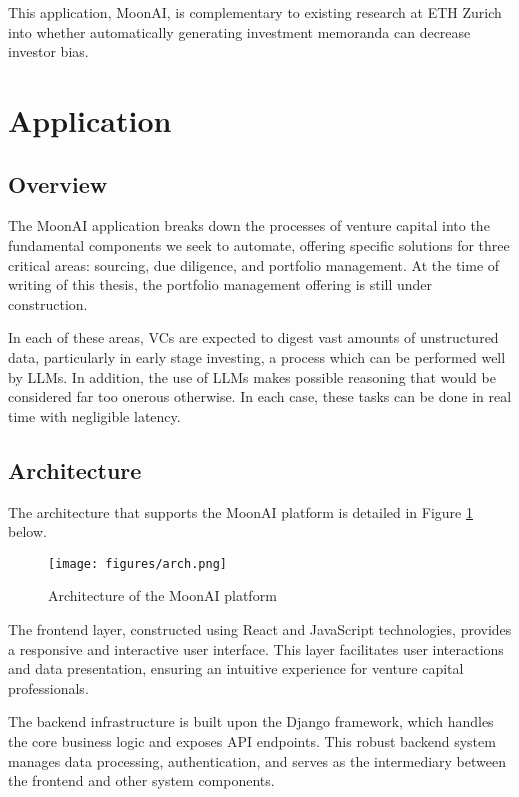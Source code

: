 \documentclass[a4paper, oneside]{discothesis}
\begin{document}
This application, MoonAI, is complementary to existing research at ETH Zurich into whether automatically generating investment memoranda can decrease investor bias. 

\section{Application}

\subsection{Overview}

The MoonAI application breaks down the processes of venture capital into the fundamental components we seek to automate, offering specific solutions for three critical areas: sourcing, due diligence, and portfolio management. At the time of writing of this thesis, the portfolio management offering is still under construction.

In each of these areas, VCs are expected to digest vast amounts of unstructured data, particularly in early stage investing, a process which can be performed well by LLMs. In addition, the use of LLMs makes possible reasoning that would be considered far too onerous otherwise. In each case, these tasks can be done in real time with negligible latency.

\subsection{Architecture}

\noindent The architecture that supports the MoonAI platform is detailed in Figure \ref{fig:architecture} below.

\begin{figure}[h]
    \centering
    \texttt{[image: figures/arch.png]}
    \caption{Architecture of the MoonAI platform}
    \label{fig:architecture}
\end{figure}

The frontend layer, constructed using React and JavaScript technologies, provides a responsive and interactive user interface. This layer facilitates user interactions and data presentation, ensuring an intuitive experience for venture capital professionals.

The backend infrastructure is built upon the Django framework, which handles the core business logic and exposes API endpoints. This robust backend system manages data processing, authentication, and serves as the intermediary between the frontend and other system components.
\end{document}

